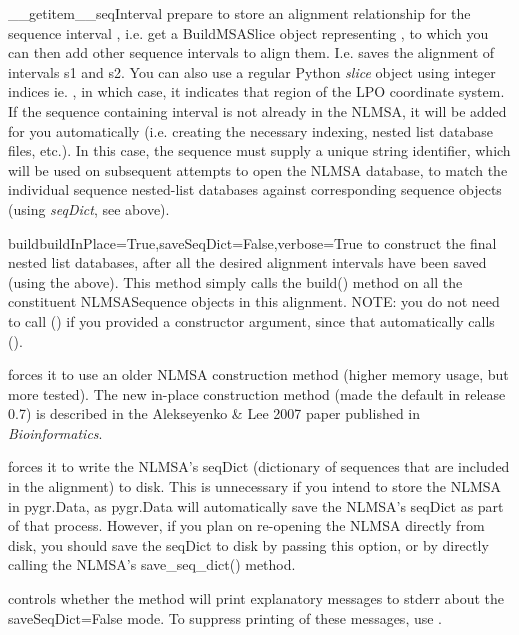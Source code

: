 \documentclass{howto}
\begin{document}
\begin{funcdesc}{__getitem__}{seqInterval}
  prepare to store an alignment relationship for the sequence interval ,
  i.e. get a BuildMSASlice object representing , to which you can
  then add other sequence intervals to align them.  I.e. 
  saves the alignment of intervals s1 and s2.
  You can also use a regular Python {\em slice} object using integer indices
  ie. , in which case, it indicates that 
  region of the LPO coordinate system.
  If the sequence containing
  interval  is not already in the NLMSA, it will be added for you automatically
  (i.e. creating the necessary indexing, nested list database files, etc.).  In this
  case, the sequence must supply a unique string identifier, which will be used
  on subsequent attempts to open the NLMSA database, to match the individual sequence
  nested-list databases against corresponding sequence objects (using {\em seqDict},
  see above).
\end{funcdesc}


\begin{funcdesc}{build}{buildInPlace=True,saveSeqDict=False,verbose=True}
  to construct the final nested list databases,
  after all the desired alignment intervals have been saved (using the
   above).  This method
  simply calls the build() method on all the constituent NLMSASequence objects
  in this alignment.  NOTE: you do not need to call () if
  you provided a  constructor argument, since that automatically
  calls ().

   forces it to use an older NLMSA construction method
  (higher memory usage, but more tested).  The new in-place construction method
  (made the default in release 0.7) is described in the Alekseyenko \& Lee 2007
  paper published in {\em Bioinformatics}.

   forces it to write the NLMSA's seqDict (dictionary
  of sequences that are included in the alignment) to disk.  This is unnecessary
  if you intend to store the NLMSA in pygr.Data, as pygr.Data will automatically
  save the NLMSA's seqDict as part of that process.  However, if you plan on
  re-opening the NLMSA directly from disk, you should save the seqDict 
  to disk by passing this option, or by directly calling the NLMSA's
  save_seq_dict() method.

   controls whether the method will print explanatory 
  messages to stderr about the saveSeqDict=False mode.
  To suppress printing of these messages, use .
\end{funcdesc}
\end{document}

